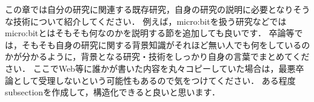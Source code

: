 この章では自分の研究に関連する既存研究，自身の研究の説明に必要となりそうな技術について紹介してください．
例えば，micro:bitを扱う研究などではmicro:bitとはそもそも何なのかを説明する節を追加しても良いです．
卒論等では，そもそも自身の研究に関する背景知識がそれほど無い人でも何をしているのかが分かるように，背景となる研究・技術をしっかり自身の言葉でまとめてください．
ここでWeb等に誰かが書いた内容を丸々コピーしていた場合は，最悪卒論として受理しないという可能性もあるので気をつけてください．
ある程度subsectionを作成して，構造化できると良いと思います．